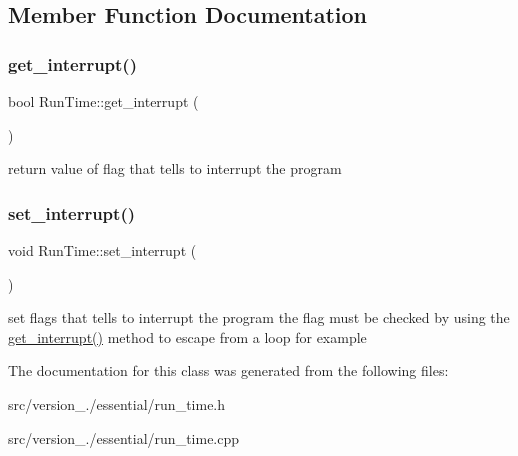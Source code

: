 \subsection{Member Function Documentation}
\mbox{\label{classez_1_1essential_1_1RunTime_a19c72bc8f521a376e68e7d63d5f14a13}} 
\subsubsection{\texorpdfstring{get\+\_\+interrupt()}{get\_interrupt()}}
{\footnotesize\ttfamily bool Run\+Time\+::get\+\_\+interrupt (\begin{DoxyParamCaption}{ }\end{DoxyParamCaption})\hspace{0.3cm}{\ttfamily [static]}}

return value of flag that tells to interrupt the program \mbox{\label{classez_1_1essential_1_1RunTime_a1ee4569c16d51377188bd2023ea87c7d}} 
\subsubsection{\texorpdfstring{set\+\_\+interrupt()}{set\_interrupt()}}
{\footnotesize\ttfamily void Run\+Time\+::set\+\_\+interrupt (\begin{DoxyParamCaption}{ }\end{DoxyParamCaption})\hspace{0.3cm}{\ttfamily [static]}}

set flags that tells to interrupt the program the flag must be checked by using the \hyperlink{classez_1_1essential_1_1RunTime_a19c72bc8f521a376e68e7d63d5f14a13}{get\+\_\+interrupt()} method to escape from a loop for example 

The documentation for this class was generated from the following files\+:\begin{DoxyCompactItemize}
\item 
src/version\+\_./essential/run\+\_\+time.\+h\item 
src/version\+\_./essential/run\+\_\+time.\+cpp\end{DoxyCompactItemize}
